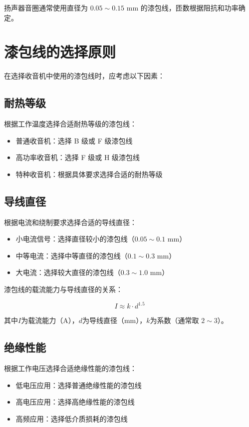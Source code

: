 \documentclass[12pt,UTF8]{ctexbook}
\begin{document}
扬声器音圈通常使用直径为 $0.05 \sim 0.15$ mm 的漆包线，匝数根据阻抗和功率确定。

\section{漆包线的选择原则}

在选择收音机中使用的漆包线时，应考虑以下因素：

\subsection{耐热等级}

根据工作温度选择合适耐热等级的漆包线：

\begin{itemize}[leftmargin=2cm]
    \item 普通收音机：选择 B 级或 F 级漆包线
    \item 高功率收音机：选择 F 级或 H 级漆包线
    \item 特种收音机：根据具体要求选择合适的耐热等级
\end{itemize}

\subsection{导线直径}

根据电流和绕制要求选择合适的导线直径：

\begin{itemize}[leftmargin=2cm]
    \item 小电流信号：选择直径较小的漆包线（$0.05 \sim 0.1$ mm）
    \item 中等电流：选择中等直径的漆包线（$0.1 \sim 0.3$ mm）
    \item 大电流：选择较大直径的漆包线（$0.3 \sim 1.0$ mm）
\end{itemize}

漆包线的载流能力与导线直径的关系：

$$ I \approx k \cdot d^{1.5} $$

其中$I$为载流能力（A），$d$为导线直径（mm），$k$为系数（通常取 $2 \sim 3$）。

\subsection{绝缘性能}

根据工作电压选择合适绝缘性能的漆包线：

\begin{itemize}[leftmargin=2cm]
    \item 低电压应用：选择普通绝缘性能的漆包线
    \item 高电压应用：选择高绝缘性能的漆包线
    \item 高频应用：选择低介质损耗的漆包线
\end{itemize}
\end{document}

